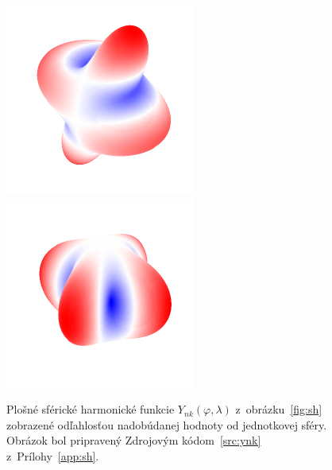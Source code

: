 \documentclass[a4paper, 12pt]{book}
\begin{document}
\begin{figure}[b!]
\includegraphics{./fig-spherical-harmonic-n4-k1-3d.pdf}
\includegraphics{./fig-spherical-harmonic-n4-k4-3d.pdf}
\caption{Plošné sférické harmonické funkcie $Y_{nk}(\varphi, \lambda)$
z~obrázku~\ref{fig:sh} zobrazené odľahlosťou nadobúdanej hodnoty od jednotkovej
sféry.  Obrázok bol pripravený Zdrojovým kódom~\ref{src:ynk}
z~Prílohy~\ref{app:sh}.}
\label{fig:sh3d}
\end{figure}
\end{document}
